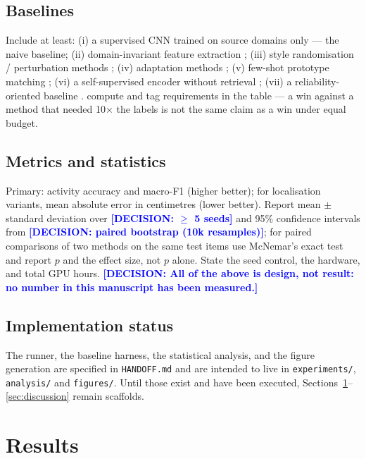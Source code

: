 \documentclass[conference]{IEEEtran}
\newcommand{\DECISION}[1]{\textcolor{blue}{\textbf{[DECISION: #1]}}}
\begin{document}
\subsection{Baselines}
Include at least: (i) a supervised CNN trained on source domains only --- the naive
baseline; (ii) domain-invariant feature extraction \cite{Zheng2019Widar3}; (iii) style
randomisation / perturbation methods \cite{Liu2024WiSR,Liu2024WiSGP}; (iv) adaptation
methods \cite{Chen2022Fidora,Prasad2024DANN,Yan2025WiSFDAGR,Zheng2025AdaWiFi};
(v) few-shot prototype matching \cite{Yin2022FewSense,Zhao2024CrossFi,Yang2023FewCS};
(vi) a self-supervised encoder without retrieval \cite{Yang2022AutoFi,Barahimi2024CPC,Lyons2024WiFiAct};
(vii) a reliability-oriented baseline \cite{Li2026Conformal}.
compute and tag requirements in the table --- a win against a method that needed 10$\times$
the labels is not the same claim as a win under equal budget.

\subsection{Metrics and statistics}
Primary: activity accuracy and macro-F1 (higher better); for localisation variants, mean
absolute error in centimetres (lower better). Report mean $\pm$ standard deviation over
\DECISION{$\geq$ 5 seeds} and 95\% confidence intervals from \DECISION{paired bootstrap
(10k resamples)}; for paired comparisons of two methods on the same test items use
McNemar's exact test and report $p$ and the effect size, not $p$ alone. State the seed
control, the hardware, and total GPU hours. \DECISION{All of the above is design, not
result: no number in this manuscript has been measured.}

\subsection{Implementation status}
The runner, the baseline harness, the statistical analysis, and the figure generation are
specified in \texttt{HANDOFF.md} and are intended to live in
\texttt{experiments/}, \texttt{analysis/} and \texttt{figures/}. Until those exist and
have been executed, Sections~\ref{sec:results}--\ref{sec:discussion} remain scaffolds.

\section{Results}
\label{sec:results}
\end{document}
